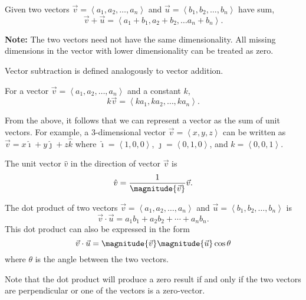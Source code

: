\documentclass[11pt]{scrartcl}
\begin{document}
\begin{definition}
    Given two vectors $\vec{v} = \left<a_{1}, a_{2}, \dots, a_{n}\right>$ and $\vec{u} = \left<b_{1}, b_{2}, \dots, b_{n}\right>$ have sum,
    \[\vec{v} + \vec{u} = \left<a_{1} + b_{1}, a_{2} + b_{2}, \dots a_{n} + b_{n}\right>.\]

    \textbf{Note:} The two vectors need not have the same dimensionality. All missing dimensions in the vector with lower dimensionality can be treated as zero.
\end{definition}

\begin{definition}
    Vector subtraction is defined analogously to vector addition.
\end{definition}

\begin{definition}
    For a vector $\vec{v} = \left<a_{1}, a_{2}, \dots, a_{n}\right>$ and a constant $k$,
    \[k\vec{v} = \left<ka_{1}, ka_{2}, \dots, ka_{n}\right>.\]
\end{definition}

\begin{corollary}
    From the above, it follows that we can represent a vector as the sum of unit vectors. For example, a 3-dimensional vector $\vec{v} = \left<x, y, z\right>$ can be written as $\vec{v} = x\hat{\imath} + y\hat{\jmath} + z\hat{k}$ where $\hat{\imath} = \left<1, 0, 0\right>$, $\hat{\jmath} = \left<0, 1, 0\right>$, and $\hat{k} = \left<0, 0, 1\right>$.
\end{corollary}

\begin{definition}
    The unit vector $\hat{v}$ in the direction of vector $\vec{v}$ is
    \[\hat{v} = \frac{1}{\magnitude{\vec{v}}}\vec{v}.\]
\end{definition}

\begin{definition}
    The dot product of two vectors $\vec{v} = \left<a_{1}, a_{2}, \dots, a_{n}\right>$ and $\vec{u} = \left<b_{1}, b_{2}, \dots, b_{n}\right>$ is
    \[\vec{v} \cdot \vec{u} = a_{1}b_{1} + a_{2}b_{2} + \cdots + a_{n}b_{n}.\]
    This dot product can also be expressed in the form
    \[\vec{v} \cdot \vec{u} = \magnitude{\vec{v}}\magnitude{\vec{u}}\cos\theta\]
    where $\theta$ is the angle between the two vectors.
\end{definition}

\begin{remark}
    Note that the dot product will produce a zero result if and only if the two vectors are perpendicular or one of the vectors is a zero-vector.
\end{remark}
\end{document}
